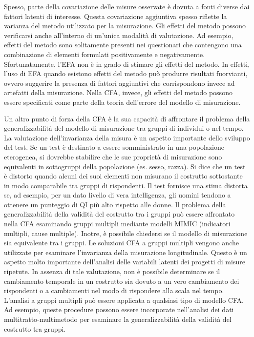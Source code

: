 \documentclass[
  11pt,
]{krantz}
\begin{document}
Spesso, parte della covariazione delle misure osservate è dovuta a fonti diverse dai fattori latenti di interesse. Questa covariazione aggiuntiva spesso riflette la varianza del metodo utilizzato per la misurazione. Gli effetti del metodo possono verificarsi anche all'interno di un'unica modalità di valutazione. Ad esempio, effetti del metodo sono solitamente presenti nei questionari che contengono una combinazione di elementi formulati positivamente e negativamente. Sfortunatamente, l'EFA non è in grado di stimare gli effetti del metodo. In effetti, l'uso di EFA quando esistono effetti del metodo può produrre risultati fuorvianti, ovvero suggerire la presenza di fattori aggiuntivi che corrispondono invece ad artefatti della misurazione. Nella CFA, invece, gli effetti del metodo possono essere specificati come parte della teoria dell'errore del modello di misurazione.

Un altro punto di forza della CFA è la sua capacità di affrontare il problema della generalizzabilità del modello di misurazione tra gruppi di individui o nel tempo. La valutazione dell'invarianza della misura è un aspetto importante dello sviluppo del test. Se un test è destinato a essere somministrato in una popolazione eterogenea, si dovrebbe stabilire che le sue proprietà di misurazione sono equivalenti in sottogruppi della popolazione (es. sesso, razza). Si dice che un test è distorto quando alcuni dei suoi elementi non misurano il costrutto sottostante in modo comparabile tra gruppi di rispondenti. Il test fornisce una stima distorta se, ad esempio, per un dato livello di vera intelligenza, gli uomini tendono a ottenere un punteggio di QI più alto rispetto alle donne. Il problema della generalizzabilità della validità del costrutto tra i gruppi può essere affrontato nella CFA esaminando gruppi multipli mediante modelli MIMIC (indicatori multipli, cause multiple). Inotre, è possibile chiedersi se il modello di misurazione sia equivalente tra i gruppi. Le soluzioni CFA a gruppi multipli vengono anche utilizzate per esaminare l'invarianza della misurazione longitudinale. Questo è un aspetto molto importante dell'analisi delle variabili latenti dei progetti di misure ripetute. In assenza di tale valutazione, non è possibile determinare se il cambiamento temporale in un costrutto sia dovuto a un vero cambiamento dei rispondenti o a cambiamenti nel modo di rispondere alla scala nel tempo. L'analisi a gruppi multipli può essere applicata a qualsiasi tipo di modello CFA. Ad esempio, queste procedure possono essere incorporate nell'analisi dei dati multitratto-multimetodo per esaminare la generalizzabilità della validità del costrutto tra gruppi.
\end{document}

